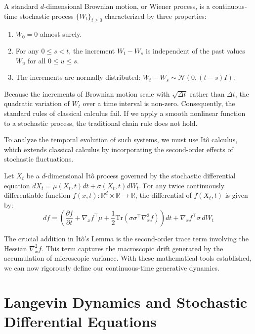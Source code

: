 \begin{definition}
A standard $d$-dimensional Brownian motion, or Wiener process, is a continuous-time stochastic process $\{W_t\}_{t \ge 0}$ characterized by three properties:
\begin{enumerate}
    \item $W_0 = 0$ almost surely.
    \item For any $0 \le s < t$, the increment $W_t - W_s$ is independent of the past values $W_u$ for all $0 \le u \le s$.
    \item The increments are normally distributed: $W_t - W_s \sim \mathcal{N}(0, (t-s)I)$.
\end{enumerate}
\end{definition}

Because the increments of Brownian motion scale with $\sqrt{\Delta t}$ rather than $\Delta t$, the quadratic variation of $W_t$ over a time interval is non-zero. Consequently, the standard rules of classical calculus fail. If we apply a smooth nonlinear function to a stochastic process, the traditional chain rule does not hold. 

To analyze the temporal evolution of such systems, we must use It\^o calculus, which extends classical calculus by incorporating the second-order effects of stochastic fluctuations. 

\begin{lemma}[It\^o's Lemma]
Let $X_t$ be a $d$-dimensional It\^o process governed by the stochastic differential equation $dX_t = \mu(X_t, t) dt + \sigma(X_t, t) dW_t$. For any twice continuously differentiable function $f(x, t) : \mathbb{R}^d \times \mathbb{R} \to \mathbb{R}$, the differential of $f(X_t, t)$ is given by:
\begin{equation}
    df = \left( \frac{\partial f}{\partial t} + \nabla_x f^\top \mu + \frac{1}{2} \text{Tr}\left( \sigma \sigma^\top \nabla^2_x f \right) \right) dt + \nabla_x f^\top \sigma \, dW_t
\end{equation}
\end{lemma}

The crucial addition in It\^o's Lemma is the second-order trace term involving the Hessian $\nabla^2_x f$. This term captures the macroscopic drift generated by the accumulation of microscopic variance. With these mathematical tools established, we can now rigorously define our continuous-time generative dynamics.

\section{Langevin Dynamics and Stochastic Differential Equations}

